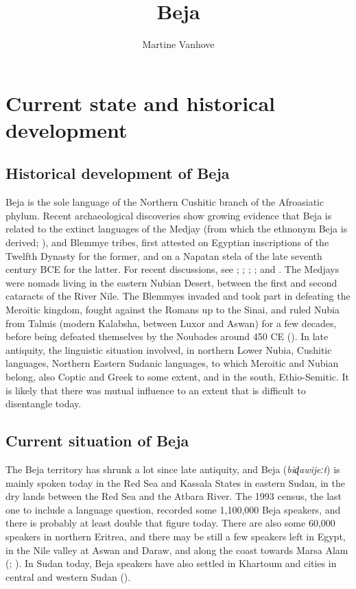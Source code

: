 \documentclass[output=paper]{langsci/langscibook}
\author{Martine Vanhove\affiliation{LLACAN (CNRS, INALCO)}}
\title{Beja}
\begin{document}
\maketitle 
  


 \section{Current state and historical development}


 \subsection{Historical development of Beja}


Beja is the sole language of the Northern Cushitic branch of the Afroasiatic phylum. Recent archaeological discoveries show growing evidence that Beja is related to the extinct languages of the Medjay (from which the ethnonym Beja is derived; \citealt[1175]{Rilly2014}), and Blemmye tribes, first attested on Egyptian inscriptions of the Twelfth Dynasty for the former, and on a Napatan stela of the late seventh century BCE for the latter. For recent discussions, see \citet{Browne2003}; \citet{El-Sayed2011}; \citet{Zibelius-Chen2014}; \citet{Rilly2014}; and \citet{Rilly2018}. The Medjays were nomads living in the eastern Nubian Desert, between the first and second cataracts of the River Nile. The Blemmyes invaded and took part in defeating the Meroitic kingdom, fought against the Romans up to the Sinai, and ruled Nubia from Talmis (modern Kalabsha, between Luxor and Aswan) for a few decades, before being defeated themselves by the Noubades around 450 CE (\citealt{Rilly2018}). In late antiquity, the linguistic situation involved, in northern Lower Nubia, Cushitic languages, Northern Eastern Sudanic languages, to which Meroitic and Nubian belong, also Coptic and Greek to some extent, and in the south, Ethio-Semitic. It is likely that there was mutual influence to an extent that is difficult to disentangle today. 


 
 \subsection{Current situation of Beja}


The Beja territory has shrunk a lot since late antiquity, and Beja (\textit{biɖawijeːt}) is mainly spoken today in the Red Sea and Kassala States in eastern Sudan, in the dry lands between the Red Sea and the Atbara River. The 1993 census, the last one to include a language question, recorded some 1,100,000 Beja speakers, and there is probably at least double that figure today. There are also some 60,000 speakers in northern Eritrea, and there may be still a few speakers left in Egypt, in the Nile valley at Aswan and Daraw, and along the coast towards Marsa Alam (\citealt{Morin1995}; \citealt{Wedekind2012}). In Sudan today, Beja speakers have also settled in Khartoum and cities in central and western Sudan (\citealt[67]{HamidAhmed2005book}).
\end{document}
